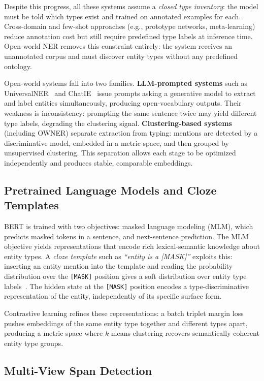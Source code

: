 \documentclass[11pt,a4paper]{article}
\begin{document}
Despite this progress, all these systems assume a \emph{closed type inventory}: the model must be told which types exist and trained on annotated examples for each. Cross-domain and few-shot approaches (e.g., prototype networks, meta-learning) reduce annotation cost but still require predefined type labels at inference time. Open-world NER removes this constraint entirely: the system receives an unannotated corpus and must discover entity types without any predefined ontology.

Open-world systems fall into two families. \textbf{LLM-prompted systems} such as UniversalNER~\cite{zhou2024} and ChatIE~\cite{wei2023} issue prompts asking a generative model to extract and label entities simultaneously, producing open-vocabulary outputs. Their weakness is inconsistency: prompting the same sentence twice may yield different type labels, degrading the clustering signal. \textbf{Clustering-based systems} (including OWNER) separate extraction from typing: mentions are detected by a discriminative model, embedded in a metric space, and then grouped by unsupervised clustering. This separation allows each stage to be optimized independently and produces stable, comparable embeddings.

\subsection{Pretrained Language Models and Cloze Templates}

BERT is trained with two objectives: masked language modeling (MLM), which predicts masked tokens in a sentence, and next-sentence prediction. The MLM objective yields representations that encode rich lexical-semantic knowledge about entity types. A \emph{cloze template} such as \emph{``{entity} is a [MASK]''} exploits this: inserting an entity mention into the template and reading the probability distribution over the \texttt{[MASK]} position gives a soft distribution over entity type labels~\cite{petroni2019}. The hidden state at the \texttt{[MASK]} position encodes a type-discriminative representation of the entity, independently of its specific surface form.

Contrastive learning refines these representations: a batch triplet margin loss pushes embeddings of the same entity type together and different types apart, producing a metric space where $k$-means clustering recovers semantically coherent entity type groups.

\subsection{Multi-View Span Detection}
\end{document}

